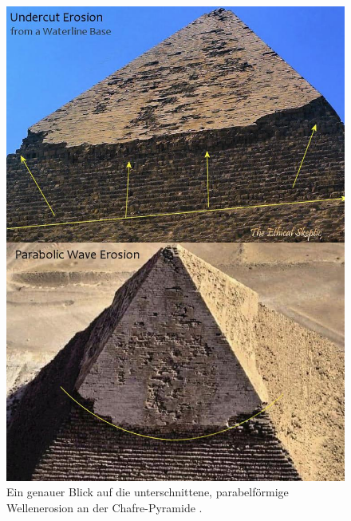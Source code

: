 \documentclass[10pt,twocolumn,letterpaper]{article}
\begin{document}
\begin{figure}[H]
\begin{center}
   \includegraphics[width=1\linewidth]{wave.jpg}
\end{center}
   \caption{Ein genauer Blick auf die unterschnittene, parabelförmige Wellenerosion an der Chafre-Pyramide \cite{27}.}
\label{fig:19}
\label{fig:onecol}
\end{figure}
\end{document}
